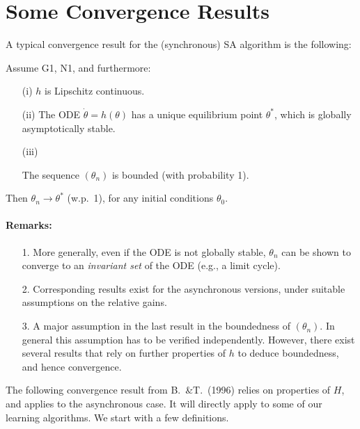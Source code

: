 \section{Some Convergence Results}

A typical convergence result for the (synchronous) SA algorithm is the following:

\begin{theorem}\label{thm:SA_1}
Assume G1, N1, and furthermore:
\begin{itemize}
\item[(i)]
$h$ is Lipschitz continuous.
\item[(ii)]
The ODE $\dot\theta=h(\theta)$ has a unique equilibrium point $\theta^*$, which
is globally asymptotically stable.
\item[(iii)]

The sequence $(\theta_n)$ is bounded (with probability 1).
\end{itemize}
Then $\theta_n\to\theta^*$ (w.p.~1), for any initial conditions $\theta_0$.
\end{theorem}


\paragraph{Remarks:}
\begin{itemize}
\item[1.]
More generally, even if the ODE is not globally stable, $\theta_n$ can be shown to converge
to an {\em invariant set} of the ODE (e.g., a limit cycle).
\item[2.]
Corresponding results exist for the asynchronous versions, under suitable
assumptions on the relative gains.
\item[3.]
A major assumption in the last result in the boundedness of $(\theta_n)$.
In general this assumption has to be verified independently. However, there
exist several results that rely on further properties of $h$ to deduce
boundedness, and hence convergence.
\end{itemize}


The following convergence result from B.~\&T.~(1996) relies on
  properties of $H$, and applies to the
asynchronous case.
It will directly apply to some of our learning algorithms.
We start with a few definitions.

